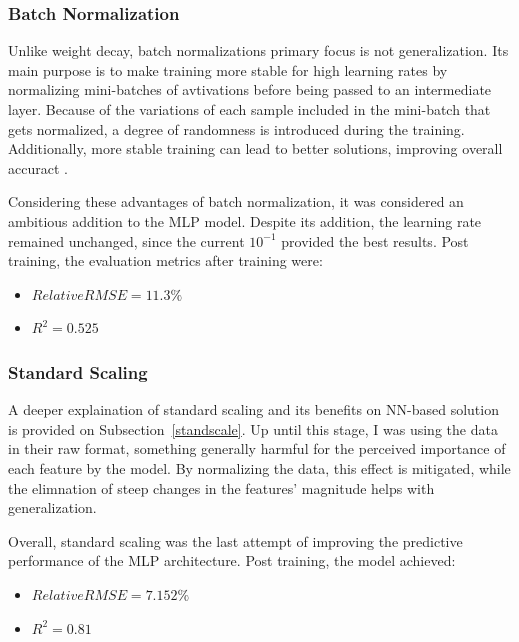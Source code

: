 \subsubsection{Batch Normalization}

Unlike weight decay, batch normalizations primary focus is not generalization. Its main purpose is to make training more stable for high learning rates by normalizing mini-batches of avtivations before being passed to an intermediate layer. Because of the variations of each sample included in the mini-batch that gets normalized, a degree of randomness is introduced during the training. Additionally, more stable training can lead to better solutions, improving overall accuract \cite{howdoesbnwork, understandingbn, understandingnoisybn}. 

Considering these advantages of batch normalization, it was considered an ambitious addition to the MLP model. Despite its addition, the learning rate remained unchanged, since the current $10^{-1}$ provided the best results. Post training, the evaluation metrics after training were:

\begin{itemize}
    \item $RelativeRMSE = 11.3\%$
    \item $R^2 = 0.525$
\end{itemize}

\subsubsection{Standard Scaling}
\label{mlp-standard-sc}

A deeper explaination of standard scaling and its benefits on NN-based solution is provided on Subsection~\ref{standscale}. Up until this stage, I was using the data in their raw format, something generally harmful for the perceived importance of each feature by the model. By normalizing the data, this effect is mitigated, while the elimnation of steep changes in the features' magnitude helps with generalization. 

Overall, standard scaling was the last attempt of improving the predictive performance of the MLP architecture. Post training, the model achieved:

\begin{itemize}
    \item $RelativeRMSE = 7.152\%$
    \item $R^2 = 0.81$
\end{itemize}


